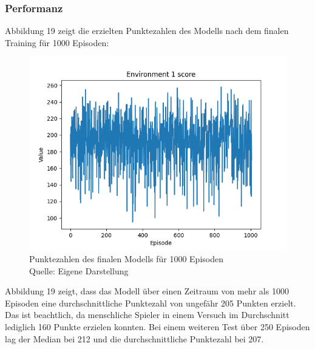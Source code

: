 \subsubsection{Performanz}
Abbildung 19 zeigt die erzielten Punktezahlen des Modells nach dem finalen Training für 1000 Episoden:
\nopagebreak
\begin{figure}[H]
	\includegraphics[width=1\textwidth]{Bilder/maskableppo_ganzschoenclever_193avg_v3.1} 
	\caption[Punktezahlen des finalen Modells für 1000 Episoden]{Punktezahlen des finalen Modells für 1000 Episoden\\ Quelle: Eigene Darstellung}
\end{figure}

Abbildung 19 zeigt, dass das Modell über einen Zeitraum von mehr als 1000 Episoden eine durchschnittliche Punktezahl von ungefähr 205 Punkten erzielt. Das ist beachtlich, da menschliche Spieler in einem Versuch im Durchschnitt lediglich 160 Punkte erzielen konnten. Bei einem weiteren Test über 250 Episoden lag der Median bei 212 und die durchschnittliche Punktezahl bei 207.\\

